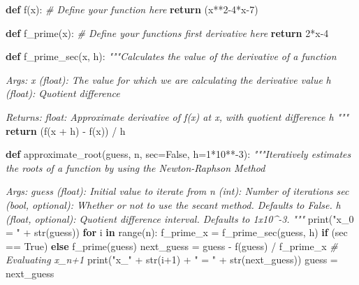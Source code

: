 \documentclass[
]{article}
\newenvironment{Shaded}{}{}
\newcommand{\BuiltInTok}[1]{#1}
\newcommand{\CommentTok}[1]{\textcolor[rgb]{0.38,0.63,0.69}{\textit{#1}}}
\newcommand{\ControlFlowTok}[1]{\textcolor[rgb]{0.00,0.44,0.13}{\textbf{#1}}}
\newcommand{\DecValTok}[1]{\textcolor[rgb]{0.25,0.63,0.44}{#1}}
\newcommand{\KeywordTok}[1]{\textcolor[rgb]{0.00,0.44,0.13}{\textbf{#1}}}
\newcommand{\NormalTok}[1]{#1}
\newcommand{\OperatorTok}[1]{\textcolor[rgb]{0.40,0.40,0.40}{#1}}
\newcommand{\StringTok}[1]{\textcolor[rgb]{0.25,0.44,0.63}{#1}}
\newcommand{\VariableTok}[1]{\textcolor[rgb]{0.10,0.09,0.49}{#1}}
\begin{document}
\begin{Shaded}
\begin{Highlighting}[]
\KeywordTok{def}\NormalTok{ f(x):}
    \CommentTok{\# Define your function here}
    \ControlFlowTok{return}\NormalTok{ (x}\OperatorTok{**}\DecValTok{2}\OperatorTok{{-}}\DecValTok{4}\OperatorTok{*}\NormalTok{x}\OperatorTok{{-}}\DecValTok{7}\NormalTok{)}

\KeywordTok{def}\NormalTok{ f\_prime(x):}
    \CommentTok{\# Define your function\textquotesingle{}s first derivative here}
    \ControlFlowTok{return} \DecValTok{2}\OperatorTok{*}\NormalTok{x}\OperatorTok{{-}}\DecValTok{4}

\KeywordTok{def}\NormalTok{ f\_prime\_sec(x, h):}
    \CommentTok{"""Calculates the value of the derivative of a function }

\CommentTok{    Args:}
\CommentTok{        x (float): The value for which we are calculating the derivative value}
\CommentTok{        h (float): Quotient difference}

\CommentTok{    Returns:}
\CommentTok{        float: Approximate derivative of f(x) at x, with quotient difference h}
\CommentTok{    """}
    \ControlFlowTok{return}\NormalTok{ (f(x }\OperatorTok{+}\NormalTok{ h) }\OperatorTok{{-}}\NormalTok{ f(x)) }\OperatorTok{/}\NormalTok{ h}
    
\KeywordTok{def}\NormalTok{ approximate\_root(guess, n, sec}\OperatorTok{=}\VariableTok{False}\NormalTok{, h}\OperatorTok{=}\DecValTok{1}\OperatorTok{*}\DecValTok{10}\OperatorTok{**{-}}\DecValTok{3}\NormalTok{):}
    \CommentTok{"""Iteratively estimates the roots of a function by using the Newton{-}Raphson Method}

\CommentTok{    Args:}
\CommentTok{        guess (float): Initial value to iterate from}
\CommentTok{        n (int): Number of iterations}
\CommentTok{        sec (bool, optional): Whether or not to use the secant method. Defaults to False.}
\CommentTok{        h (float, optional): Quotient difference interval. Defaults to 1x10\^{}{-}3.}
\CommentTok{    """}
    \BuiltInTok{print}\NormalTok{(}\StringTok{"x\_0 = "} \OperatorTok{+} \BuiltInTok{str}\NormalTok{(guess))}
    \ControlFlowTok{for}\NormalTok{ i }\KeywordTok{in} \BuiltInTok{range}\NormalTok{(n):}
\NormalTok{        f\_prime\_x }\OperatorTok{=}\NormalTok{ f\_prime\_sec(guess, h) }\ControlFlowTok{if}\NormalTok{ (sec }\OperatorTok{==} \VariableTok{True}\NormalTok{) }\ControlFlowTok{else}\NormalTok{ f\_prime(guess)}
\NormalTok{        next\_guess }\OperatorTok{=}\NormalTok{ guess }\OperatorTok{{-}}\NormalTok{ f(guess) }\OperatorTok{/}\NormalTok{ f\_prime\_x }\CommentTok{\# Evaluating x\_n+1}
        \BuiltInTok{print}\NormalTok{(}\StringTok{"x\_"} \OperatorTok{+} \BuiltInTok{str}\NormalTok{(i}\OperatorTok{+}\DecValTok{1}\NormalTok{) }\OperatorTok{+} \StringTok{" = "} \OperatorTok{+} \BuiltInTok{str}\NormalTok{(next\_guess))}
\NormalTok{        guess }\OperatorTok{=}\NormalTok{ next\_guess}
\end{Highlighting}
\end{Shaded}
\end{document}
